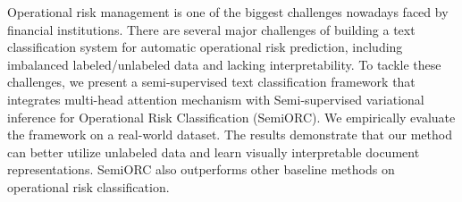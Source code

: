 Operational risk management is one of the biggest challenges nowadays faced by financial institutions. There are several major challenges of building a text classification system for automatic operational risk prediction, including imbalanced labeled/unlabeled data and lacking interpretability. To tackle these challenges, we present a semi-supervised text classification framework that integrates multi-head attention mechanism with Semi-supervised variational inference for Operational Risk Classification (SemiORC). We empirically evaluate the framework on a real-world dataset.  The results demonstrate that our method can better utilize unlabeled data and learn visually interpretable document representations. SemiORC also outperforms other baseline methods on operational risk classification.
